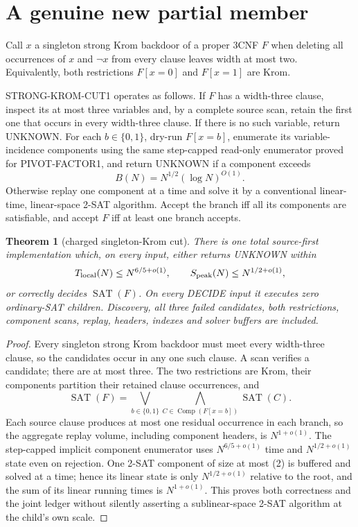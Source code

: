 \documentclass[11pt]{article}
\newtheorem{theorem}{Theorem}
\newcommand{\SAT}{\operatorname{SAT}}
\begin{document}
\section{A genuine new partial member}
Call $x$ a singleton strong Krom backdoor of a proper 3CNF $F$ when deleting
all occurrences of $x$ and $\neg x$ from every clause leaves width at most
two.  Equivalently, both restrictions $F[x=0]$ and $F[x=1]$ are Krom.

\textsc{STRONG-KROM-CUT1} operates as follows.  If $F$ has a width-three
clause, inspect its at most three variables and, by a complete source scan,
retain the first one that occurs in every width-three clause.  If there is
no such variable, return UNKNOWN.  For each $b\in\{0,1\}$, dry-run
$F[x=b]$, enumerate its variable-incidence components using the same
step-capped read-only enumerator proved for \textsc{PIVOT-FACTOR1}, and
return UNKNOWN if a component exceeds
\begin{equation}
 B(N)=N^{1/2}(\log N)^{O(1)}.                            \tag{2}
\end{equation}
Otherwise replay one component at a time and solve it by a conventional
linear-time, linear-space 2-SAT algorithm.  Accept the branch iff all its
components are satisfiable, and accept $F$ iff at least one branch accepts.

\begin{theorem}[charged singleton-Krom cut]\label{thm:krom}
There is one total source-first implementation which, on every input,
either returns UNKNOWN within
\[
 T_{\rm local}(N)\le N^{6/5+o(1)},\qquad
 S_{\rm peak}(N)\le N^{1/2+o(1)},
\]
or correctly decides $\SAT(F)$.  On every DECIDE input it executes zero
ordinary-SAT children.  Discovery, all three failed candidates, both
restrictions, component scans, replay, headers, indexes and solver buffers
are included.
\end{theorem}
\begin{proof}
Every singleton strong Krom backdoor must meet every width-three clause, so
the candidates occur in any one such clause.  A scan verifies a candidate;
there are at most three.  The two restrictions are Krom, their components
partition their retained clause occurrences, and
\begin{equation}
 \SAT(F)=\bigvee_{b\in\{0,1\}}
            \bigwedge_{C\in\operatorname{Comp}(F[x=b])}\SAT(C).     \tag{3}
\end{equation}
Each source clause produces at most one residual occurrence in each branch,
so the aggregate replay volume, including component headers, is
$N^{1+o(1)}$.  The step-capped implicit component enumerator uses
$N^{6/5+o(1)}$ time and $N^{1/2+o(1)}$ state even on rejection.  One 2-SAT
component of size at most (2) is buffered and solved at a time; hence its
linear state is only $N^{1/2+o(1)}$ relative to the root, and the sum of its
linear running times is $N^{1+o(1)}$.  This proves both correctness and the
joint ledger without silently asserting a sublinear-space 2-SAT algorithm
at the child's own scale.
\end{proof}
\end{document}

